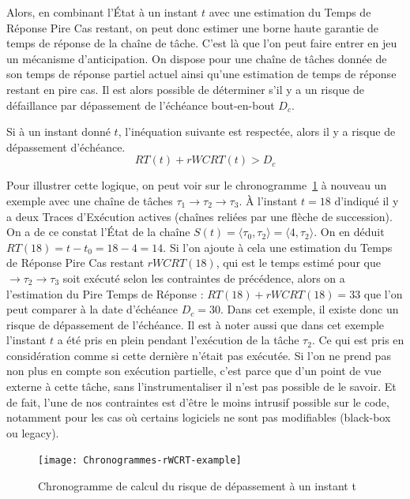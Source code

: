 \documentclass[french, a4paper, 11pt, twoside, pdftex]{StyleThese}
\begin{document}
    Alors, en combinant l'État à un instant $t$ avec une estimation du Temps de Réponse Pire Cas restant, on peut donc estimer une borne haute garantie de temps de réponse de la chaîne de tâche. C'est là que l'on peut faire entrer en jeu un mécanisme d'anticipation. 
    On dispose pour une chaîne de tâches donnée de son temps de réponse partiel actuel ainsi qu'une estimation de temps de réponse restant en pire cas. Il est alors possible de déterminer s'il y a un risque de défaillance par dépassement de l'échéance bout-en-bout $D_c$.
    \begin{theorem}
    	Si à un instant donné $t$, l'inéquation suivante est respectée, alors il y a risque de dépassement d'échéance.
    	\begin{equation*} 
    		RT(t) + rWCRT(t) > D_c
    	\end{equation*}
    \end{theorem}

	Pour illustrer cette logique, on peut voir sur le chronogramme~\ref{fig:chronogram_rWCRT_example} à nouveau un exemple avec une chaîne de tâches $\tau_1 \rightarrow \tau_2 \rightarrow \tau_3$. À l'instant $t=18$ d'indiqué il y a deux Traces d'Exécution actives (chaînes reliées par une flèche de succession). On a de ce constat l'État de la chaîne $S(t) = \langle \tau_0, \tau_2\rangle = \langle 4, \tau_{2} \rangle $.
	On en déduit $ RT(18) = t - t_0 = 18-4 = 14 $. Si l'on ajoute à cela une estimation du Temps de Réponse Pire Cas restant $rWCRT(18)$, qui est le temps estimé pour que $\rightarrow \tau_2 \rightarrow \tau_3$ soit exécuté selon les contraintes de précédence, alors on a l'estimation du Pire Temps de Réponse : $ RT(18) + rWCRT(18) = 33$ que l'on peut comparer à la date d'échéance $ D_c = 30 $. Dans cet exemple, il existe donc un risque de dépassement de l'échéance.
	Il est à noter aussi que dans cet exemple l'instant $t$ a été pris en plein pendant l'exécution de la tâche $ \tau_2 $. Ce qui est pris en considération comme si cette dernière n'était pas exécutée. Si l'on ne prend pas non plus en compte son exécution partielle, c'est parce que d'un point de vue externe à cette tâche, sans l'instrumentaliser il n'est pas possible de le savoir. Et de fait, l'une de nos contraintes est d'être le moins intrusif possible sur le code, notamment pour les cas où certains logiciels ne sont pas modifiables (black-box ou legacy). 
	
    \begin{figure}[ht]
		\centering 
		\texttt{[image: Chronogrammes-rWCRT-example]}
		\caption{Chronogramme de calcul du risque de dépassement à un instant t}
		\label{fig:chronogram_rWCRT_example}
	\end{figure}
\end{document}
